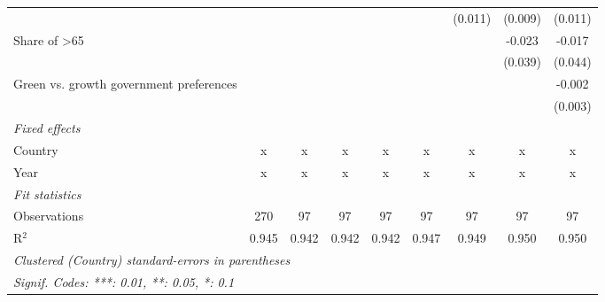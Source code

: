 \begin{table}[htbp]
\begin{tabular}{lcccccccc}
                                              &         &               &         &         &         & (0.011) & (0.009) & (0.011)\\   
      Share of >65                            &         &               &         &         &         &         & -0.023  & -0.017\\   
                                              &         &               &         &         &         &         & (0.039) & (0.044)\\   
      Green vs. growth government preferences &         &               &         &         &         &         &         & -0.002\\   
                                              &         &               &         &         &         &         &         & (0.003)\\   
      \emph{Fixed effects}\\
      Country                                 & x       & x             & x       & x       & x       & x       & x       & x\\  
      Year                                    & x       & x             & x       & x       & x       & x       & x       & x\\  
      \midrule \emph{Fit statistics}\\
      Observations                            & 270     & 97            & 97      & 97      & 97      & 97      & 97      & 97\\  
      R$^2$                                   & 0.945   & 0.942         & 0.942   & 0.942   & 0.947   & 0.949   & 0.950   & 0.950\\  
      \midrule
      \multicolumn{9}{l}{\emph{Clustered (Country) standard-errors in parentheses}}\\
      \multicolumn{9}{l}{\emph{Signif. Codes: ***: 0.01, **: 0.05, *: 0.1}}\\
   \end{tabular}
\end{table}



